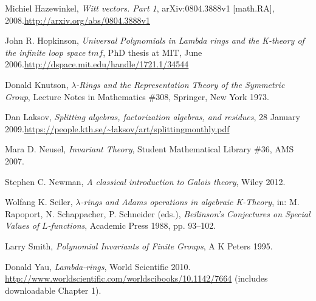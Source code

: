 \documentclass[numbers=enddot,12pt,final,onecolumn,notitlepage]{scrartcl}%
\begin{document}
\begin{thebibliography}{999999999}
Michiel Hazewinkel, \textit{Witt vectors. Part
1}, arXiv:0804.3888v1 [math.RA], 2008.\newline\url{http://arxiv.org/abs/0804.3888v1}

John R. Hopkinson, \textit{Universal Polynomials
in Lambda rings and the K-theory of the infinite loop space }$tmf$, PhD thesis
at MIT, June 2006.\newline\url{http://dspace.mit.edu/handle/1721.1/34544}

Donald Knutson, $\lambda$\textit{-Rings and the
Representation Theory of the Symmetric Group}, Lecture Notes in Mathematics
\#308, Springer, New York 1973.

Dan Laksov, \textit{Splitting algebras,
factorization algebras, and residues}, 28 January 2009.\newline\url{https://people.kth.se/~laksov/art/splittingmonthly.pdf}

Mara D. Neusel, \textit{Invariant Theory}, Student
Mathematical Library \#36, AMS 2007.

Stephen C. Newman, \textit{A classical
introduction to Galois theory}, Wiley 2012.

Wolfang K. Seiler, $\lambda$\textit{-rings and
Adams operations in algebraic K-Theory}, in: M. Rapoport, N. Schappacher, P.
Schneider (eds.), \textit{Beilinson's Conjectures on Special Values of }%
$L$\textit{-functions}, Academic Press 1988, pp. 93--102.

Larry Smith, \textit{Polynomial Invariants of Finite
Groups}, A K Peters 1995.

Donald Yau, \textit{Lambda-rings}, World Scientific
2010.\newline%
\url{http://www.worldscientific.com/worldscibooks/10.1142/7664}\newline%
(includes downloadable Chapter 1).
\end{thebibliography}
\end{document}
